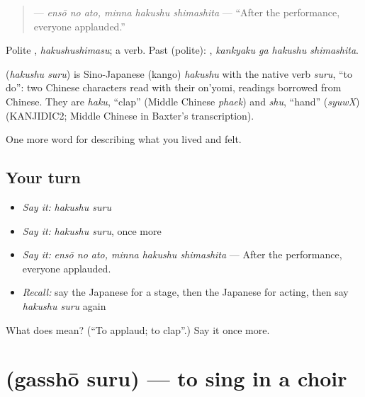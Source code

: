 \begin{quote}
\textbf{  } — \emph{ensō no ato, minna hakushu shimashita} — \textquotedblleft{}After the performance, everyone applauded.\textquotedblright{}
\end{quote}

Polite \textbf{}, \emph{hakushushimasu}; a  verb. Past (polite): \textbf{ }, \emph{kankyaku ga hakushu shimashita}.

\begin{cousinweb}
\textbf{} (\emph{hakushu suru}) is Sino-Japanese (kango) \emph{hakushu} with the native verb \emph{suru}, \textquotedblleft{}to do\textquotedblright{}: two Chinese characters read with their on'yomi, readings borrowed from Chinese. They are \emph{haku}, \textquotedblleft{}clap\textquotedblright{} (Middle Chinese \emph{phaek}) and \emph{shu}, \textquotedblleft{}hand\textquotedblright{} (\emph{syuwX}) (KANJIDIC2; Middle Chinese in Baxter's transcription).
\end{cousinweb}

\begin{grammarlens}[title={What you've built}]
One more word for describing what you lived and felt.
\end{grammarlens}

\subsection*{Your turn}
\begin{itemize}
\raggedright
  \item \emph{Say it:} \emph{hakushu suru}
  \item \emph{Say it:} \emph{hakushu suru}, once more
  \item \emph{Say it:} \emph{ensō no ato, minna hakushu shimashita} — After the performance, everyone applauded.
  \item \emph{Recall:} say the Japanese for a stage, then the Japanese for acting, then say \emph{hakushu suru} again
\end{itemize}

\begin{tcolorbox}[breakable,colback=teal!4,colframe=teal!35!black,title={Before you move on}]
What does  mean? (\textquotedblleft{}To applaud; to clap\textquotedblright{}.) Say it once more.
\end{tcolorbox}
\section[\texorpdfstring{\ja{がっしょうする} (gasshō suru)}{がっしょうする (gasshō suru)}]{ (gasshō suru) — to sing in a choir}

